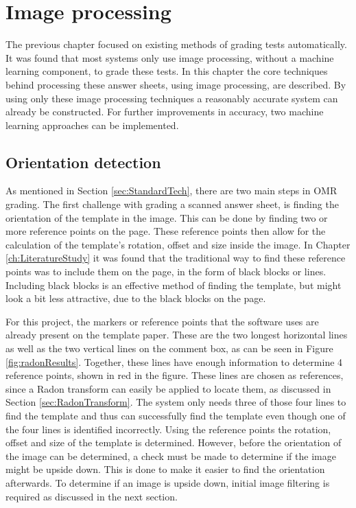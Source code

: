 \chapter{Image processing}
\label{ch:ImageProcessing}
\graphicspath{{Chapter3/Chapter3Figures/}}
The previous chapter focused on existing methods of grading tests automatically. It was found that most systems only use image processing, without a machine learning component, to grade these tests. In this chapter the core techniques behind processing these answer sheets, using image processing, are described. By using only these image processing techniques a reasonably accurate system can already be constructed. For further improvements in accuracy, two machine learning approaches can be implemented.

\section{Orientation detection}
\label{sec:orientDetect}
As mentioned in Section \ref{sec:StandardTech}, there are two main steps in OMR grading. The first challenge with grading a scanned answer sheet, is finding the orientation of the template in the image. This can be done by finding two or more reference points on the page. These reference points then allow for the calculation of the template's rotation, offset and size inside the image. In Chapter \ref{ch:LiteratureStudy} it was found that the traditional way to find these reference points was to include them on the page, in the form of black blocks or lines. Including black blocks is an effective method of finding the template, but might look a bit less attractive, due to the black blocks on the page.

For this project, the markers or reference points that the software uses are already present on the template paper. These are the two longest horizontal lines as well as the two vertical lines on the comment box, as can be seen in Figure \ref{fig:radonResults}. Together, these lines have enough information to determine 4 reference points, shown in red in the figure. These lines are chosen as references, since a Radon transform can easily be applied to locate them, as discussed in Section \ref{sec:RadonTransform}. The system only needs three of those four lines to find the template and thus can successfully find the template even though one of the four lines is identified incorrectly. Using the reference points the rotation, offset and size of the template is determined. However, before the orientation of the image can be determined, a check must be made to determine if the image might be upside down. This is done to make it easier to find the orientation afterwards. To determine if an image is upside down, initial image filtering is required as discussed in the next section.

